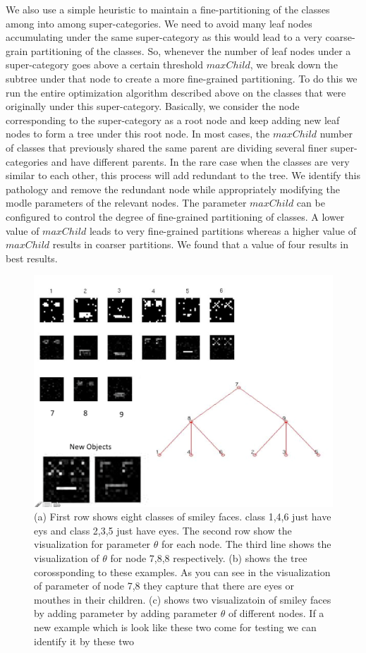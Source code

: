 \documentclass[10pt,twocolumn,letterpaper]{article}
\begin{document}
We also use a simple heuristic to maintain a fine-partitioning of the classes among into among super-categories. 
We need to avoid many leaf nodes accumulating under the 
same super-category as this would lead to a very coarse-grain partitioning of the classes.  So, whenever the number of leaf nodes under a 
super-category goes above a certain threshold $maxChild$, we break down the subtree under that node to create
 a more fine-grained partitioning.  To do this we run the entire optimization algorithm described above on the classes that were originally under this
 super-category. Basically, we consider the node corresponding to the super-category as a root node and keep adding new leaf nodes 
 to form a tree under this root node. In most cases, the $maxChild$ number of classes that previously shared the same parent are dividing
 several finer super-categories and have different parents.  In the rare case when the classes are very similar to each other, this process will add
 redundant to the tree. We identify this pathology and remove the redundant node while appropriately modifying the modle parameters of the 
 relevant nodes. The parameter $maxChild$ can be configured to control the degree of fine-grained partitioning of classes. A lower value
 of $maxChild$ leads to very fine-grained partitions whereas a higher value of $maxChild$ results in coarser partitions. We found that 
 a value of four results in best results. 
 
 \begin{figure}[t]
 	\begin{center}
 		\includegraphics[width=0.8\linewidth]{smiley}
 	\end{center}
 	\caption{(a) First row shows eight classes of smiley faces. class 1,4,6 just have eys and class 2,3,5 just have eyes. The second row show the visualization for parameter $\theta$ for each node. The third line shows the visualization of $\theta$ for node 7,8,8 respectively. (b) shows the tree corossponding to these examples. As you can see in the visualization of parameter of node 7,8 they capture that there are eyes or mouthes in their children. (c) shows two visualizatoin of smiley faces by adding parameter by adding parameter $\theta$ of different nodes. If a new example which is look like these two come for testing we can identify it by these two}
 	\label{fig:smiley}
 \end{figure}
\end{document}
